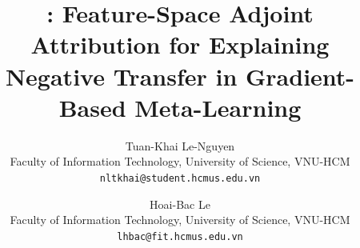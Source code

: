 \documentclass[10pt,twocolumn,letterpaper]{article}
\title{\fama: Feature-Space Adjoint Attribution for Explaining\\ Negative Transfer in Gradient-Based Meta-Learning}
\author{
Tuan-Khai Le-Nguyen\\
Faculty of Information Technology, University of Science, VNU-HCM\\
{\tt\small nltkhai@student.hcmus.edu.vn}
\and
Hoai-Bac Le\\
Faculty of Information Technology, University of Science, VNU-HCM\\
{\tt\small lhbac@fit.hcmus.edu.vn}
}
\begin{document}
\maketitle










{
    \small
    
    
}


\end{document}
